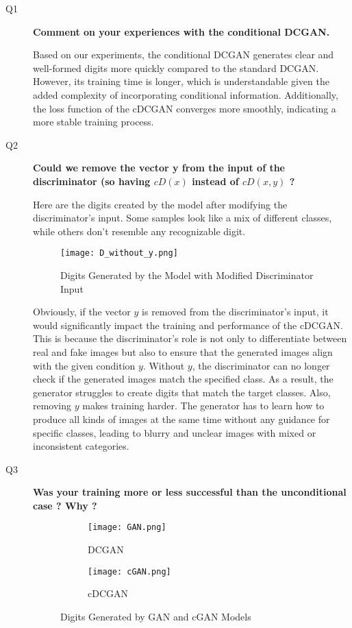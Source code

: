 \documentclass{rapportECL}
\begin{document}
\begin{description}
    \item[Q1 ] \textbf{Comment on your experiences with the conditional DCGAN.}
    
    Based on our experiments, the conditional DCGAN generates clear and well-formed digits more quickly compared to the standard DCGAN. However, its training time is longer, which is understandable given the added complexity of incorporating conditional information. Additionally, the loss function of the cDCGAN converges more smoothly, indicating a more stable training process.

    \item[Q2 ] \textbf{Could we remove the vector y from the input of the discriminator (so having $cD(x)$ instead of $cD(x, y)$ ?}

    Here are the digits created by the model after modifying the discriminator's input. Some samples look like a mix of different classes, while others don’t resemble any recognizable digit.

    \begin{figure}[H]
    \centering
    \texttt{[image: D\_without\_y.png]}
    \caption{Digits Generated by the Model with Modified Discriminator Input}
    \end{figure}
  
    Obviously, if the vector $y$ is removed from the discriminator’s input, it would significantly impact the training and performance of the cDCGAN. This is because the discriminator’s role is not only to differentiate between real and fake images but also to ensure that the generated images align with the given condition $y$. Without $y$, the discriminator can no longer check if the generated images match the specified class. As a result, the generator struggles to create digits that match the target classes. Also, removing $y$ makes training harder. The generator has to learn how to produce all kinds of images at the same time without any guidance for specific classes, leading to blurry and unclear images with mixed or inconsistent categories. 
    

    \item[Q3 ] \textbf{Was your training more or less successful than the unconditional case ? Why ?}
    
    \begin{figure}[H]
    \centering
    \begin{subfigure}[b]{0.45\textwidth}
        \centering
        \texttt{[image: GAN.png]}
        \caption{DCGAN}
    \end{subfigure}
    \hfill
    \begin{subfigure}[b]{0.45\textwidth}
        \centering
        \texttt{[image: cGAN.png]}
        \caption{cDCGAN}
    \end{subfigure}
    \caption{Digits Generated by GAN and cGAN Models}
    \label{fig:generated_samples}
\end{figure}


\end{description}
\end{document}
